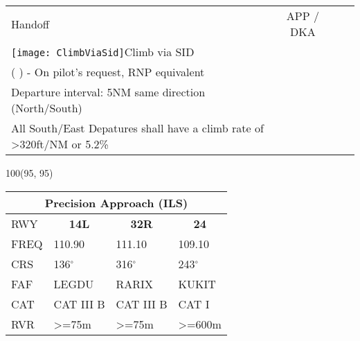 \documentclass[10pt,landscape,a4paper]{article}
\newcommand{\x}{\texttt{[image: ClimbViaSid]}}
\begin{document}
\begin{textblock}{40}
\begin{table}[]
\begin{tabular}{lccccccc}
\multicolumn{2}{|l}{Handoff} & 
\multicolumn{4}{c}{\textunderscore{}APP / DKA} & 
\multicolumn{1}{c|}{} & 
\multicolumn{1}{l}{} \\ \cline{1-7}
\multicolumn{5}{l}{\x \color{red}Climb via SID} \\
\multicolumn{5}{l}{( ) - On pilot's request, RNP equivalent} \\
\multicolumn{5}{l}{Departure interval: 5NM same direction (North/South)} \\
\multicolumn{5}{l}{All South/East Depatures shall have a climb rate of \textgreater{}320ft/NM or 5.2\%}
\end{tabular}
\end{table}
\end{textblock}



\begin{textblock}{100}(95, 95)
\begin{table}[]
\begin{tabular}{llll}
\multicolumn{4}{c}{\textbf{Precision Approach (ILS)}} \\ \hline
\multicolumn{1}{|l|}{RWY} & \multicolumn{1}{c|}{\textbf{14L}} & \multicolumn{1}{c|}{\textbf{32R}} & \multicolumn{1}{c|}{\textbf{24}} \\ \hline
\multicolumn{1}{|l|}{FREQ} & \multicolumn{1}{l|}{110.90} & \multicolumn{1}{l|}{111.10} & \multicolumn{1}{l|}{109.10} \\
\multicolumn{1}{|l|}{CRS} & \multicolumn{1}{l|}{136$^\circ$} & \multicolumn{1}{l|}{316$^\circ$} & \multicolumn{1}{l|}{243$^\circ$} \\
\multicolumn{1}{|l|}{FAF} & \multicolumn{1}{l|}{LEGDU} & \multicolumn{1}{l|}{RARIX} & \multicolumn{1}{l|}{KUKIT} \\
\multicolumn{1}{|l|}{CAT} & \multicolumn{1}{l|}{CAT III B} & \multicolumn{1}{l|}{CAT III B} & \multicolumn{1}{l|}{CAT I} \\
\multicolumn{1}{|l|}{RVR} & \multicolumn{1}{l|}{\textgreater{}=75m} & \multicolumn{1}{l|}{\textgreater{}=75m} & \multicolumn{1}{l|}{\textgreater{}=600m} \\ \hline
\end{tabular}
\end{table}
\end{textblock}
\end{document}
